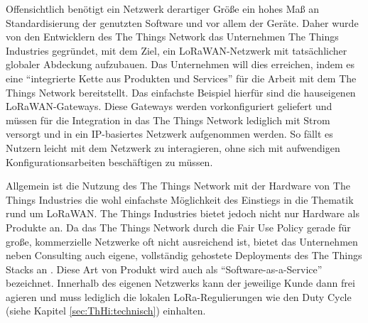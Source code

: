 Offensichtlich benötigt ein Netzwerk derartiger Größe ein hohes Maß an Standardisierung der genutzten Software und vor allem der Geräte. Daher wurde von den Entwicklern des The Things Network das Unternehmen The Things Industries gegründet, mit dem Ziel, ein LoRaWAN-Netzwerk mit tatsächlicher globaler Abde\-ckung aufzubauen. Das Unternehmen will dies erreichen, indem es eine ``integrierte Kette aus Produkten und Services'' für die Arbeit mit dem The Things Network bereitstellt. Das einfachste Beispiel hierfür sind die hauseigenen LoRaWAN-Gateways. Diese Gateways werden vorkonfiguriert geliefert und müssen für die Integration in das The Things Network lediglich mit Strom versorgt und in ein IP-basiertes Netzwerk aufgenommen werden. So fällt es Nutzern leicht mit dem Netzwerk zu inter\-agieren, ohne sich mit aufwendigen Konfigurationsarbeiten beschäftigen zu müssen.

Allgemein ist die Nutzung des The Things Network mit der Hardware von The Things Industries die wohl einfachste Möglichkeit des Einstiegs in die Thematik rund um LoRaWAN. The Things Industries bietet jedoch nicht nur Hardware als Produkte an. Da das The Things Network durch die Fair Use Policy gerade für große, kommerzielle Netzwerke oft nicht ausreichend ist, bietet das Unternehmen neben Consulting auch eigene, vollständig gehostete Deployments des The Things Stacks an . Diese Art von Produkt wird auch als ``Software-as-a-Service'' bezeichnet. Innerhalb des eigenen Netzwerks kann der jeweilige Kunde dann frei agieren und muss lediglich die lokalen LoRa-Regulierungen wie den Duty Cycle (siehe Kapitel \ref{sec:ThHi:technisch}) einhalten.